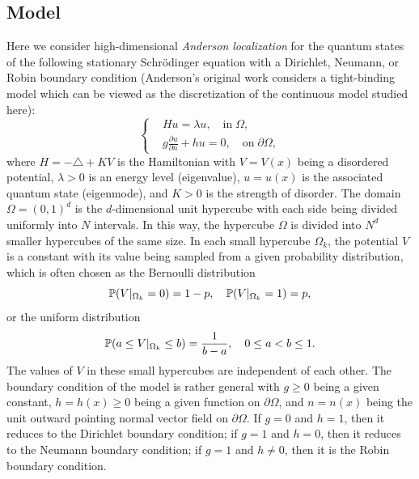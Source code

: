 \documentclass[a4paper,11pt]{article}
\begin{document}
\subsection{Model}
Here we consider high-dimensional \emph{Anderson localization} for the quantum states of the following stationary Schr\"{o}dinger equation with a Dirichlet, Neumann, or Robin boundary condition (Anderson's original work \cite{anderson1958absence} considers a tight-binding model which can be viewed as the discretization of the continuous model studied here):
\begin{equation}\label{anderson}
\left\{
\begin{split}
& Hu = \lambda u, \quad \textrm{in} \; \Omega, \\
& g \frac{\partial u}{\partial n} + h u = 0, \quad \textrm{on} \; \partial  \Omega,
\end{split}
\right.
\end{equation}
where $H = -\triangle + K V$ is the Hamiltonian with $V = V(x)$ being a disordered potential, $\lambda>0$ is an energy level (eigenvalue), $u = u(x)$ is the associated quantum state (eigenmode), and $K > 0$ is the strength of disorder. The domain $\Omega = (0,1)^d$ is the $d$-dimensional unit hypercube with each side being divided uniformly into $N$ intervals. In this way, the hypercube $\Omega$ is divided into $N^d$ smaller hypercubes of the same size. In each small hypercube $\Omega_k$, the potential $V$ is a constant with its value being sampled from a given probability distribution, which is often chosen as the Bernoulli distribution
\begin{equation}\label{bernoulli}
\mathbb{P}(V|_{\Omega_k} = 0) = 1-p, \quad \mathbb{P}(V|_{\Omega_k} = 1) = p,
\end{equation}
or the uniform distribution
\begin{equation*}
\mathbb{P}(a \leq V|_{\Omega_k} \leq b) = \frac{1}{b-a}, \quad 0 \leq a < b \leq 1.
\end{equation*}
The values of $V$ in these small hypercubes are independent of each other. The boundary condition of the model is rather general with $g \geq 0$ being a given constant, $h = h(x) \geq 0$ being a given function on $\partial \Omega$, and $n = n(x)$ being the unit outward pointing normal vector field on $\partial \Omega$. If $g = 0$ and $h = 1$, then it reduces to the Dirichlet boundary condition; if $g = 1$ and $h = 0$, then it reduces to the Neumann boundary condition; if $g = 1$ and $h \neq 0$, then it is the Robin boundary condition.
\end{document}
